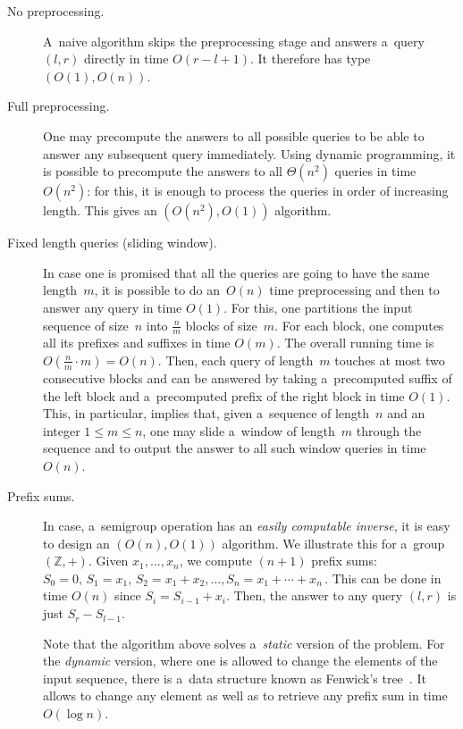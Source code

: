 \documentclass[11pt,letterpaper]{article}
\begin{document}
\begin{description}
\item[No preprocessing.] A~naive algorithm skips the preprocessing stage and answers a~query $(l,r)$ directly in time $O(r-l+1)$. It therefore has type $(O(1), O(n))$.

\item[Full preprocessing.] One may precompute the answers to all possible queries to be able to answer any subsequent query immediately. Using dynamic programming, it is possible to precompute the answers to all $\Theta(n^2)$ queries in time $O(n^2)$: for this, it is enough to process the queries in order of increasing length. This gives an $(O(n^2), O(1))$ algorithm.

\item[Fixed length queries (sliding window).] In case one is promised that all the queries are going to have the same length~$m$, it is possible to do an~$O(n)$ time preprocessing and then to answer any query in time $O(1)$. For this, one partitions the input sequence of size~$n$ into $\frac nm$ blocks of size~$m$. For each block, one computes all its prefixes and suffixes in time $O(m)$. The overall running time is $O(\frac nm \cdot m)=O(n)$. Then, each query of length~$m$ touches at most two consecutive blocks and can be answered by taking a~precomputed suffix of the left block and a~precomputed prefix of the right block in time $O(1)$. This, in particular, implies that, given a~sequence of length~$n$ and an integer $1 \le m \le n$, one may slide a~window of length~$m$ through the sequence and to output the answer to all such window queries in time $O(n)$.

\item[Prefix sums.] In case, a~semigroup operation has an {\em easily computable inverse}, it is easy to design an $(O(n), O(1))$ algorithm. We illustrate this for a~group $(\mathbb{Z}, +)$. Given $x_1, \dotsc, x_n$, we compute $(n+1)$ prefix sums:
\(S_0=0,\, S_1=x_1,\, S_2=x_1+x_2, \dotsc, S_n=x_1+\dotsb+x_n\,.\)
This can be done in time $O(n)$ since $S_i=S_{i-1}+x_i$. Then, the answer to any query $(l,r)$ is just $S_r-S_{l-1}$.

Note that the algorithm above solves a~{\em static} version of the problem. For the {\em dynamic} version, where one is allowed to change the elements of the input sequence, there is a~data structure known as Fenwick's tree~\cite{DBLP:journals/spe/Fenwick94}. It allows to change any element as well as to retrieve any prefix sum in time $O(\log n)$.




\end{description}
\end{document}
